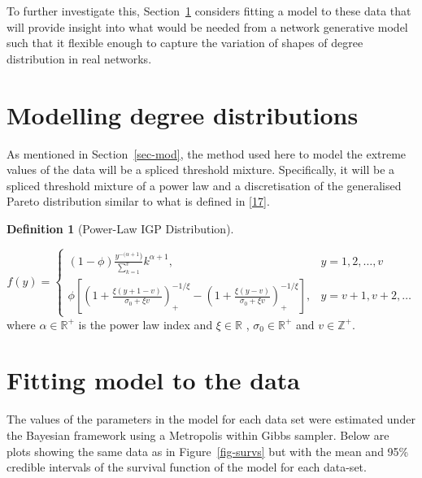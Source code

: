 \documentclass[
  10pt,
  a4paper,
]{scrreprt}
\theoremstyle{definition}
\newtheorem{definition}{Definition}[section]
\theoremstyle{plain}
\theoremstyle{plain}
\theoremstyle{remark}
\begin{document}
{To further investigate this, Section~\ref{sec-realmodel} considers
fitting a model to these data that will provide insight into what would
be needed from a network generative model such that it flexible enough
to capture the variation of shapes of degree distribution in real
networks.

\hypertarget{sec-realmodel}{%
\section{Modelling degree distributions}\label{sec-realmodel}}

As mentioned in Section~\ref{sec-mod}, the method used here to model the
extreme values of the data will be a spliced threshold mixture.
Specifically, it will be a spliced threshold mixture of a power law and
a discretisation of the generalised Pareto distribution similar to what
is defined in {[}\protect\hyperlink{ref-Rohrbeck_2018}{17}{]}.

\begin{definition}[Power-Law IGP
Distribution]\protect\hypertarget{def-pligp}{}\label{def-pligp}

\[
f(y) = \begin{cases}
(1-\phi)\displaystyle\frac{y^{-(\alpha+1})}{\sum_{k=1}^v}k^{\alpha+1}, & y=1,2,\ldots, v\\
\phi\left[\left(1+\displaystyle\frac{\xi(y+1-v)}{\sigma_0+\xi v}\right)_+^{-1/\xi}-\left(1+\displaystyle\frac{\xi(y-v)}{\sigma_0+\xi v}\right)_+^{-1/\xi}\right],&y=v+1, v+2,\ldots
\end{cases}
\] where \(\alpha\in\mathbb R^+\) is the power law index and
\(\xi \in \mathbb R\) , \(\sigma_0 \in \mathbb R^+\) and
\(v\in\mathbb Z^+.\)

\end{definition}

\hypertarget{fitting-model-to-the-data}{%
\section{Fitting model to the data}\label{fitting-model-to-the-data}}

The values of the parameters in the model for each data set were
estimated under the Bayesian framework using a Metropolis within Gibbs
sampler. Below are plots showing the same data as in
Figure~\ref{fig-survs} but with the mean and 95\% credible intervals of
the survival function of the model for each data-set.

\begin{figure}[H]


\end{figure}}
\end{document}
